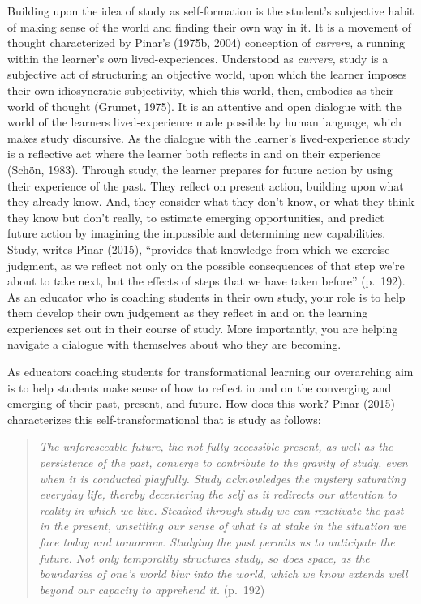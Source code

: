 \documentclass[
]{book}
\begin{document}
Building upon the idea of study as self-formation is the student's subjective habit of making sense of the world and finding their own way in it. It is a movement of thought characterized by Pinar's (1975b, 2004) conception of \emph{currere,} a running within the learner's own lived-experiences. Understood as \emph{currere,} study is a subjective act of structuring an objective world, upon which the learner imposes their own idiosyncratic subjectivity, which this world, then, embodies as their world of thought (Grumet, 1975). It is an attentive and open dialogue with the world of the learners lived-experience made possible by human language, which makes study discursive. As the dialogue with the learner's lived-experience study is a reflective act where the learner both reflects in and on their experience (Schön, 1983). Through study, the learner prepares for future action by using their experience of the past. They reflect on present action, building upon what they already know. And, they consider what they don't know, or what they think they know but don't really, to estimate emerging opportunities, and predict future action by imagining the impossible and determining new capabilities. Study, writes Pinar (2015), ``provides that knowledge from which we exercise judgment, as we reflect not only on the possible consequences of that step we're about to take next, but the effects of steps that we have taken before'' (p.~192). As an educator who is coaching students in their own study, your role is to help them develop their own judgement as they reflect in and on the learning experiences set out in their course of study. More importantly, you are helping navigate a dialogue with themselves about who they are becoming.

As educators coaching students for transformational learning our overarching aim is to help students make sense of how to reflect in and on the converging and emerging of their past, present, and future. How does this work? Pinar (2015) characterizes this self-transformational that is study as follows:

\begin{quote}
\emph{The unforeseeable future, the not fully accessible present, as well as the persistence of the past, converge to contribute to the gravity of study, even when it is conducted playfully. Study acknowledges the mystery saturating everyday life, thereby decentering the self as it redirects our attention to reality in which we live. Steadied through study we can reactivate the past in the present, unsettling our sense of what is at stake in the situation we face today and tomorrow. Studying the past permits us to anticipate the future. Not only temporality structures study, so does space, as the boundaries of one's world blur into the world, which we know extends well beyond our capacity to apprehend it.} (p.~192)
\end{quote}
\end{document}
